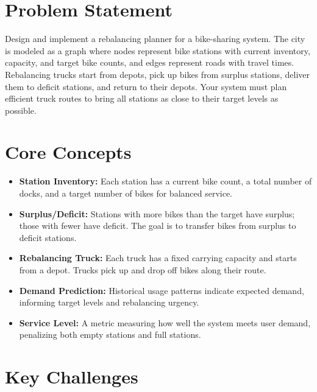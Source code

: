 \section{Problem Statement}

Design and implement a rebalancing planner for a bike-sharing system. The city is modeled as a graph where nodes represent bike stations with current inventory, capacity, and target bike counts, and edges represent roads with travel times. Rebalancing trucks start from depots, pick up bikes from surplus stations, deliver them to deficit stations, and return to their depots. Your system must plan efficient truck routes to bring all stations as close to their target levels as possible.

\section{Core Concepts}

\begin{itemize}
  \item \textbf{Station Inventory:} Each station has a current bike count, a total number of docks, and a target number of bikes for balanced service.
  \item \textbf{Surplus/Deficit:} Stations with more bikes than the target have surplus; those with fewer have deficit. The goal is to transfer bikes from surplus to deficit stations.
  \item \textbf{Rebalancing Truck:} Each truck has a fixed carrying capacity and starts from a depot. Trucks pick up and drop off bikes along their route.
  \item \textbf{Demand Prediction:} Historical usage patterns indicate expected demand, informing target levels and rebalancing urgency.
  \item \textbf{Service Level:} A metric measuring how well the system meets user demand, penalizing both empty stations and full stations.
\end{itemize}

\section{Key Challenges}

